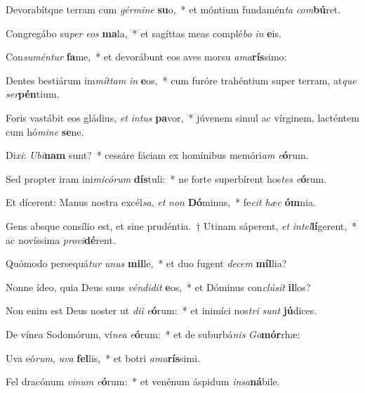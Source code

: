 \item Devorabítque terram cum \textit{gér}\textit{mi}\textit{ne} \textbf{su}o,~* et móntium fundamén\textit{ta} \textit{com}\textbf{bú}ret.
\item Congregábo su\textit{per} \textit{e}\textit{os} \textbf{ma}la,~* et sagíttas meas complé\textit{bo} \textit{in} \textbf{e}is.
\item Con\textit{su}\textit{mén}\textit{tur} \textbf{fa}me,~* et devorábunt eos aves morsu \textit{a}\textit{ma}\textbf{rís}simo:
\item Dentes bestiárum im\textit{mít}\textit{tam} \textit{in} \textbf{e}os,~* cum furóre trahéntium super terram, at\textit{que} \textit{ser}\textbf{pén}tium.
\item Foris vastábit eos gládius, \textit{et} \textit{in}\textit{tus} \textbf{pa}vor,~* júvenem simul ac vírginem, lacténtem cum hó\textit{mi}\textit{ne} \textbf{se}ne.
\item Di\textit{xi}: \textit{U}\textit{bi}\textbf{nam} sunt?~* cessáre fáciam ex homínibus memóri\textit{am} \textit{e}\textbf{ó}rum.
\item Sed propter iram ini\textit{mi}\textit{có}\textit{rum} \textbf{dís}tuli:~* ne forte superbírent hos\textit{tes} \textit{e}\textbf{ó}rum.
\item Et dícerent: Manus nostra excél\textit{sa}, \textit{et} \textit{non} \textbf{Dó}minus,~* fe\textit{cit} \textit{hæc} \textbf{óm}nia.
\item Gens absque consílio est, et sine prudéntia.~† Utinam sáperent, \textit{et} \textit{in}\textit{tel}\textbf{lí}gerent,~* ac novíssima \textit{pro}\textit{vi}\textbf{dé}rent.
\item Quómodo persequá\textit{tur} \textit{u}\textit{nus} \textbf{mil}le,~* et duo fugent \textit{de}\textit{cem} \textbf{míl}lia?
\item Nonne ídeo, quia Deus suus \textit{vén}\textit{di}\textit{dit} \textbf{e}os,~* et Dóminus con\textit{clú}\textit{sit} \textbf{il}los?
\item Non enim est Deus noster ut \textit{di}\textit{i} \textit{e}\textbf{ó}rum:~* et inimíci nos\textit{tri} \textit{sunt} \textbf{jú}dices.
\item De vínea Sodomórum, ví\textit{ne}\textit{a} \textit{e}\textbf{ó}rum:~* et de suburbá\textit{nis} \textit{Go}\textbf{mór}rhæ:
\item Uva eó\textit{rum}, \textit{u}\textit{va} \textbf{fel}lis,~* et botri \textit{a}\textit{ma}\textbf{rís}simi.
\item Fel dracónum \textit{vi}\textit{num} \textit{e}\textbf{ó}rum:~* et venénum áspidum \textit{in}\textit{sa}\textbf{ná}bile.

